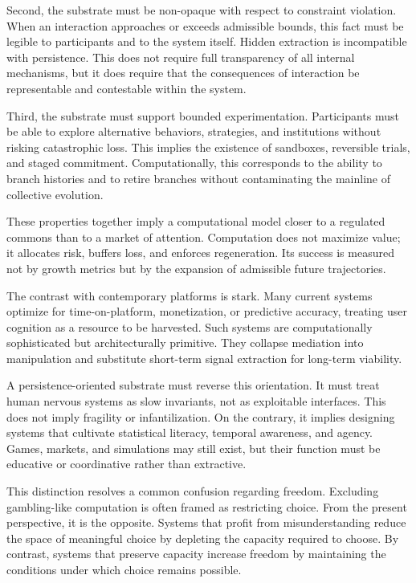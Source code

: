\documentclass[12pt,oneside]{book}
\begin{document}
Second, the substrate must be non-opaque with respect to constraint violation. When an interaction approaches or exceeds admissible bounds, this fact must be legible to participants and to the system itself. Hidden extraction is incompatible with persistence. This does not require full transparency of all internal mechanisms, but it does require that the consequences of interaction be representable and contestable within the system.

Third, the substrate must support bounded experimentation. Participants must be able to explore alternative behaviors, strategies, and institutions without risking catastrophic loss. This implies the existence of sandboxes, reversible trials, and staged commitment. Computationally, this corresponds to the ability to branch histories and to retire branches without contaminating the mainline of collective evolution.

These properties together imply a computational model closer to a regulated commons than to a market of attention. Computation does not maximize value; it allocates risk, buffers loss, and enforces regeneration. Its success is measured not by growth metrics but by the expansion of admissible future trajectories.

The contrast with contemporary platforms is stark. Many current systems optimize for time-on-platform, monetization, or predictive accuracy, treating user cognition as a resource to be harvested. Such systems are computationally sophisticated but architecturally primitive. They collapse mediation into manipulation and substitute short-term signal extraction for long-term viability.

A persistence-oriented substrate must reverse this orientation. It must treat human nervous systems as slow invariants, not as exploitable interfaces. This does not imply fragility or infantilization. On the contrary, it implies designing systems that cultivate statistical literacy, temporal awareness, and agency. Games, markets, and simulations may still exist, but their function must be educative or coordinative rather than extractive.

This distinction resolves a common confusion regarding freedom. Excluding gambling-like computation is often framed as restricting choice. From the present perspective, it is the opposite. Systems that profit from misunderstanding reduce the space of meaningful choice by depleting the capacity required to choose. By contrast, systems that preserve capacity increase freedom by maintaining the conditions under which choice remains possible.
\end{document}
